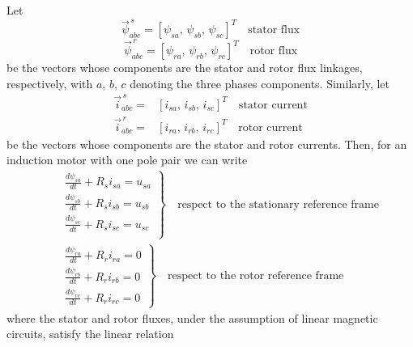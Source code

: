 \documentclass[12pt,a4paper,oneside]{book}
\begin{document}
\begin{onehalfspace}
Let
\begin{equation} \label{im_eq_1}
	\vec{\psi}^{\,s}_{abc} = \left[\psi_{sa},\,\psi_{sb},\,\psi_{sc}\right]^T 
	\quad\text{stator flux}
\end{equation}
\begin{equation} \label{im_eq_2}
	\vec{\psi}^{\,r}_{abc} = \left[\psi_{ra},\,\psi_{rb},\,\psi_{rc}\right]^T 
	\quad\text{rotor flux}
\end{equation}
be the vectors whose components are the stator and rotor flux linkages, 
respectively, with $a$, $b$, $c$ denoting the three phases components. 
Similarly, let
\begin{equation} \label{im_eq_3}
	\begin{aligned}
		\vec{i}^{\,s}_{abc} = & \left[i_{sa},\,i_{sb},\,i_{sc}\right]^T 
		\quad\text{stator current} \\ 
		\vec{i}^{\,r}_{abc} = & \left[i_{ra},\,i_{rb},\,i_{rc}\right]^T 
		\quad\text{rotor current}
	\end{aligned}
\end{equation}
be the vectors whose components are the stator and rotor currents. Then, for an 
induction motor with one pole pair we can write
\begin{equation} \label{im_eq_4}
	\begin{aligned}
		&\left. \begin{aligned}
			& \frac{d\psi_{sa}}{dt} + R_s i_{sa} = u_{sa} \\[6pt]
			& \frac{d\psi_{sb}}{dt} + R_s i_{sb} = u_{sb} \\[6pt]
			& \frac{d\psi_{sc}}{dt} + R_s i_{sc} = u_{sc} \\[6pt]
		\end{aligned}\right\rbrace \quad\text{respect to the stationary 
			reference frame}\\[6pt]
		&\left. \begin{aligned}
			& \frac{d\psi_{ra}}{dt} + R_r i_{ra} = 0 \\[6pt]
			& \frac{d\psi_{rb}}{dt} + R_r i_{rb} = 0 \\[6pt]
			& \frac{d\psi_{rc}}{dt} + R_r i_{rc} = 0 
		\end{aligned} \right\rbrace \quad\text{respect to the rotor reference 
			frame}
	\end{aligned}
\end{equation}
where the stator and rotor fluxes, under the assumption of linear magnetic 
circuits, satisfy the linear relation
\begin{equation}\label{im_eq_5}

\end{equation}
\end{onehalfspace}
\end{document}
